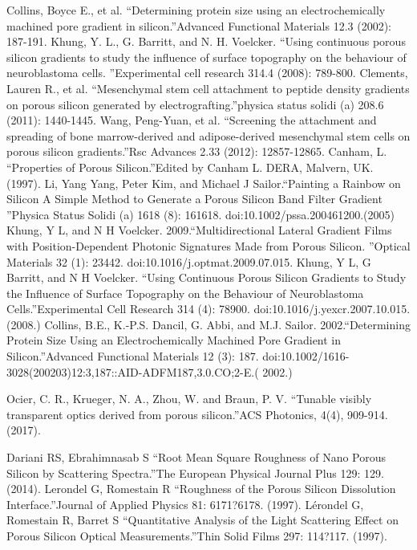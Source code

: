 \documentclass[a4paper,11pt,]{book}
\begin{document}
{\begin{thebibliography}{X}
Collins, Boyce E., et al. \textquotedblleft Determining protein size using an electrochemically machined pore gradient in silicon.\textquotedblright Advanced Functional Materials 12.3 (2002): 187-191.
 Khung, Y. L., G. Barritt, and N. H. Voelcker. \textquotedblleft Using continuous porous silicon gradients to study the influence of surface topography on the behaviour of neuroblastoma cells. \textquotedblright Experimental cell research 314.4 (2008): 789-800.
 Clements, Lauren R., et al. \textquotedblleft Mesenchymal stem cell attachment to peptide density gradients on porous silicon generated by electrografting.\textquotedblright physica status solidi (a) 208.6 (2011): 1440-1445.
 Wang, Peng-Yuan, et al. \textquotedblleft Screening the attachment and spreading of bone marrow-derived and adipose-derived mesenchymal stem cells on porous silicon gradients.\textquotedblright Rsc Advances 2.33 (2012): 12857-12865.
 Canham, L. \textquotedblleft Properties of Porous Silicon.\textquotedblright Edited by Canham L. DERA, Malvern, UK. (1997).
 Li, Yang Yang, Peter Kim, and Michael J Sailor.\textquotedblleft Painting a Rainbow on Silicon A Simple Method to Generate a Porous Silicon Band Filter Gradient \textquotedblright Physica Status Solidi (a) 1618 (8): 161618. doi:10.1002/pssa.200461200.(2005)
 Khung, Y L, and N H Voelcker. 2009.\textquotedblleft Multidirectional Lateral Gradient Films with Position-Dependent Photonic Signatures Made from Porous Silicon. \textquotedblright Optical Materials 32 (1): 23442. doi:10.1016/j.optmat.2009.07.015. 
  Khung, Y L, G Barritt, and N H Voelcker.  \textquotedblleft Using Continuous Porous Silicon Gradients to Study the Influence of Surface Topography on the Behaviour of Neuroblastoma Cells.\textquotedblright Experimental Cell Research 314 (4): 78900. doi:10.1016/j.yexcr.2007.10.015.(2008.)
 Collins, B.E., K.-P.S. Dancil, G. Abbi, and M.J. Sailor. 2002.\textquotedblleft Determining Protein Size Using an Electrochemically Machined Pore Gradient in Silicon.\textquotedblright Advanced Functional Materials 12 (3): 187. doi:10.1002/1616-3028(200203)12:3,187::AID-ADFM187,3.0.CO;2-E.( 2002.)

 Ocier, C. R., Krueger, N. A., Zhou, W. and  Braun, P. V. \textquotedblleft Tunable visibly transparent optics derived from porous silicon.\textquotedblright ACS Photonics, 4(4), 909-914. (2017).

 Dariani RS, Ebrahimnasab S  \textquotedblleft Root Mean Square Roughness of Nano Porous Silicon by Scattering Spectra.\textquotedblright The European Physical Journal Plus 129: 129. (2014).
 Lerondel G, Romestain R \textquotedblleft Roughness of the Porous Silicon Dissolution Interface.\textquotedblright Journal of Applied Physics 81:  6171?6178. (1997).
 Lérondel G, Romestain R, Barret S \textquotedblleft Quantitative Analysis of the Light Scattering Effect on Porous Silicon 
Optical Measurements.\textquotedblright Thin Solid Films 297: 114?117. (1997).


\end{thebibliography}}
\end{document}
